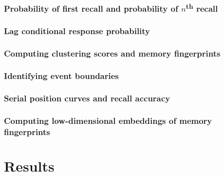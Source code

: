 \documentclass[11pt]{article}
\begin{document}
\subsubsection*{Probability of first recall and probability of $n$\textsuperscript{th} recall}

\subsubsection*{Lag conditional response probability}

\subsubsection*{Computing clustering scores and memory fingerprints}

\subsubsection*{Identifying event boundaries}

\subsubsection*{Serial position curves and recall accuracy}

\subsubsection*{Computing low-dimensional embeddings of memory fingerprints}

\section*{Results}
\end{document}

